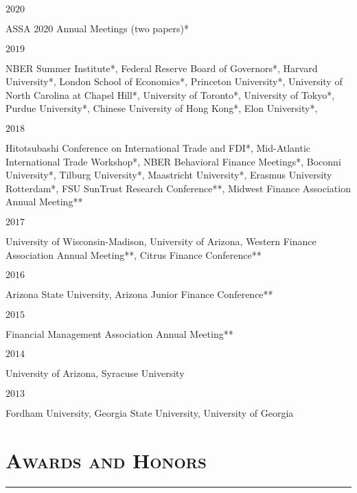 \documentclass[10pt,letterpaper]{article}
\renewenvironment{itemize}{
  \begin{list}{}{
    \setlength{\leftmargin}{1.5em}
    \setlength{\itemsep}{0.25em}
    \setlength{\parskip}{0pt}
    \setlength{\parsep}{0.25em}
  }
}{
  \end{list}
}
\begin{document}
\bigskip
\begin{itemize}
\item $2020$

	ASSA 2020 Annual Meetings (two papers)*
	
\bigskip
\item $2019$

	NBER Summer Institute*, Federal Reserve Board of Governors*, Harvard University*, London School of Economics*, Princeton University*, University of North Carolina at Chapel Hill*, University of Toronto*, University of Tokyo*, Purdue University*, Chinese University of Hong Kong*, Elon University*, 

\bigskip
\item $2018$ 

Hitotsubashi Conference on International Trade and FDI*, Mid-Atlantic International Trade Workshop*, NBER Behavioral Finance Meetings*, Boconni University*, Tilburg University*, Maastricht University*, Erasmus University Rotterdam*, FSU SunTrust Research Conference**, Midwest Finance Association Annual Meeting** 
  
\bigskip
\item $2017$ 

University of Wisconsin-Madison, University of Arizona, Western Finance Association Annual Meeting**, Citrus Finance Conference**

\bigskip
\item $2016$ 

Arizona State University, Arizona Junior Finance Conference**

\bigskip
\item $2015$ 

Financial Management Association Annual Meeting**

\bigskip
\item $2014$ 

University of Arizona, Syracuse University

\bigskip
\item $2013$ 

Fordham University, Georgia State University, University of Georgia 

\end{itemize}










\section*{\textsc{Awards and Honors}}
\nointerlineskip
\vspace{-3mm}
\rule{\textwidth}{0.5mm}
\end{document}
